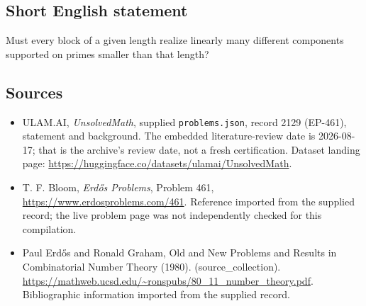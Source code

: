 \documentclass[11pt,a4paper]{article}
\begin{document}
\subsection{Short English statement}

Must every block of a given length realize linearly many different components supported on primes smaller than that length?

\subsection{Sources}

{\small

\begin{itemize}

\item[\hypertarget{source:2129:1}{S1}] ULAM.AI, \emph{UnsolvedMath}, supplied \texttt{problems.json}, record 2129 (EP-461), statement and background. The embedded literature-review date is 2026-08-17; that is the archive’s review date, not a fresh certification. Dataset landing page: \url{https://huggingface.co/datasets/ulamai/UnsolvedMath}.

\item[\hypertarget{source:2129:2}{S2}] T. F. Bloom, \emph{Erdős Problems}, Problem 461, \url{https://www.erdosproblems.com/461}. Reference imported from the supplied record; the live problem page was not independently checked for this compilation.

\item[\hypertarget{source:2129:3}{S3}] Paul Erdős and Ronald Graham, Old and New Problems and Results in Combinatorial Number Theory (1980). (source\_collection). \url{https://mathweb.ucsd.edu/~ronspubs/80_11_number_theory.pdf}. Bibliographic information imported from the supplied record.

\end{itemize}

}

\label{end:2129}
\end{document}
